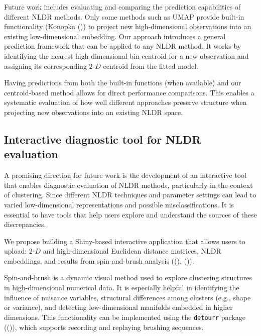 \documentclass[
  11pt,
  a4paper,
]{report}
\begin{document}
Future work includes evaluating and comparing the prediction
capabilities of different NLDR methods. Only some methods such as UMAP
provide built-in functionality (Konopka
()) to project new high-dimensional
observations into an existing low-dimensional embedding. Our approach
introduces a general prediction framework that can be applied to any
NLDR method. It works by identifying the nearest high-dimensional bin
centroid for a new observation and assigning its corresponding
\(2\text{-}D\) centroid from the fitted model.

Having predictions from both the built-in functions (when available) and
our centroid-based method allows for direct performance comparisons.
This enables a systematic evaluation of how well different approaches
preserve structure when projecting new observations into an existing
NLDR space.

\subsection{Interactive diagnostic tool for NLDR
evaluation}\label{interactive-diagnostic-tool-for-nldr-evaluation}

A promising direction for future work is the development of an
interactive tool that enables diagnostic evaluation of NLDR methods,
particularly in the context of clustering. Since different NLDR
techniques and parameter settings can lead to varied low-dimensional
representations and possible misclassifications. It is essential to have
tools that help users explore and understand the sources of these
discrepancies.

We propose building a Shiny-based interactive application that allows
users to upload: \(2\text{-}D\) and high-dimensional Euclidean distance
matrices, NLDR embeddings, and results from spin-and-brush analysis
((),
()).

Spin-and-brush is a dynamic visual method used to explore clustering
structures in high-dimensional numerical data. It is especially helpful
in identifying the influence of nuisance variables, structural
differences among clusters (e.g., shape or variance), and detecting
low-dimensional manifolds embedded in higher dimensions. This
functionality can be implemented using the \texttt{detourr} package
(()), which supports
recording and replaying brushing sequences.
\end{document}
